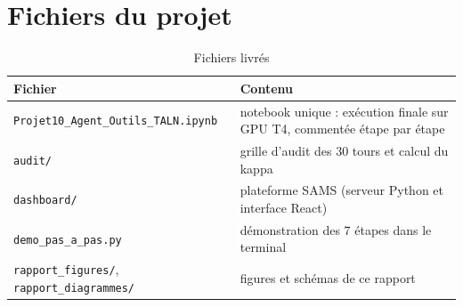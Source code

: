 \documentclass[11pt,a4paper]{report}
\begin{document}
\chapter{Fichiers du projet}
\begin{table}[H]
\centering
\caption{Fichiers livrés}
\begin{tabularx}{\textwidth}{@{}lY@{}}
\toprule
\textbf{Fichier} & \textbf{Contenu} \\
\midrule
\texttt{Projet10\_Agent\_Outils\_TALN.ipynb} & notebook unique : exécution finale sur GPU T4, commentée étape par étape \\
\texttt{audit/} & grille d'audit des 30 tours et calcul du kappa \\
\texttt{dashboard/} & plateforme SAMS (serveur Python et interface React) \\
\texttt{demo\_pas\_a\_pas.py} & démonstration des 7 étapes dans le terminal \\
\texttt{rapport\_figures/}, \texttt{rapport\_diagrammes/} & figures et schémas de ce rapport \\
\bottomrule
\end{tabularx}
\end{table}
\end{document}
